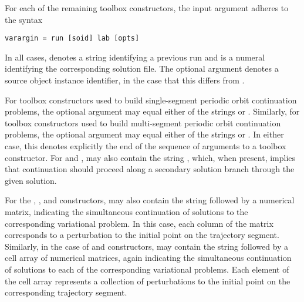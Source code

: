For each of the remaining toolbox constructors, the  input argument adheres to the syntax
\begin{lstlisting}[language=coco-highlight]
varargin = run [soid] lab [opts]
\end{lstlisting}
In all cases,  denotes a string identifying a previous run and  is a numeral identifying the corresponding solution file. The optional argument  denotes a source object instance identifier, in the case that this differs from .

For toolbox constructors used to build single-segment periodic orbit continuation problems, the optional  argument may equal either of the strings  or . Similarly, for toolbox constructors used to build multi-segment periodic orbit continuation problems, the optional  argument may equal either of the strings  or . In either case, this denotes explicitly the end of the sequence of arguments to a  toolbox constructor. For  and ,  may also contain the string , which, when present, implies that continuation should proceed along a secondary solution branch through the given solution.

For the , , and  constructors,  may also contain the string  followed by a numerical matrix, indicating the simultaneous continuation of solutions to the corresponding variational problem. In this case, each column of the matrix corresponds to a perturbation to the initial point on the trajectory segment. Similarly, in the case of  and  constructors,  may contain the string  followed by a cell array of numerical matrices, again indicating the simultaneous continuation of solutions to each of the corresponding variational problems. Each element of the cell array represents a collection of perturbations to the initial point on the corresponding trajectory segment.


